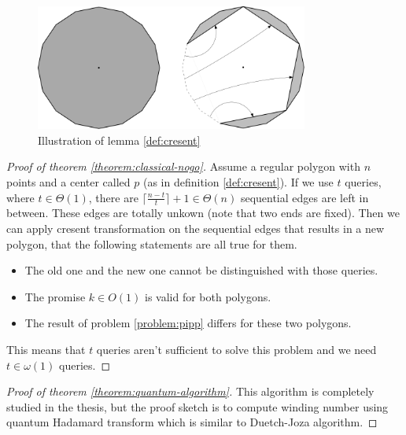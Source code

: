 \documentclass{article}
\begin{document}
\begin{figure}[H]
\centering
\includegraphics[width=0.8\textwidth]{shape.png}
\caption{Illustration of lemma \ref{def:cresent}}
\end{figure}

\begin{proof}[Proof of theorem \ref{theorem:classical-nogo}]
Assume a regular polygon with $n$ points and a center called $p$ (as in definition \ref{def:cresent}). If we use $t$ queries, where $t \in \Theta(1)$, there are $\lceil\frac{n - t}{t}\rceil + 1 \in \Theta(n)$ sequential edges are left in between. These edges are totally unkown (note that two ends are fixed).
Then we can apply cresent transformation on the sequential edges that results in a new polygon, that the following statements are all true for them.
\begin{itemize}
    \item The old one and the new one cannot be distinguished with those queries.
    \item The promise $k \in O(1)$ is valid for both polygons.
    \item The result of problem \ref{problem:pipp} differs for these two polygons.
\end{itemize}
This means that $t$ queries aren't sufficient to solve this problem and we need $t \in \omega(1)$ queries. 
\end{proof}

\begin{proof}[Proof of theorem \ref{theorem:quantum-algorithm}]
This algorithm is completely studied in the thesis, but the proof sketch is to compute winding number \cite{hormann} using quantum Hadamard transform which is similar to Duetch-Joza algorithm\cite{deutsch}.
\end{proof}



\end{document}
